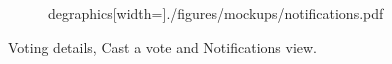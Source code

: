 \documentclass{scrartcl}
\begin{document}
\begin{figure}[h]
\begin{subfigure}[b]{0.3\textwidth}
degraphics[width=\textwidth]{./figures/mockups/notifications.pdf}
    \end{subfigure}
    \caption{Voting details, Cast a vote and Notifications view.}
    \label{fig:details-cast-notifications-view}
\end{figure}
\end{document}
